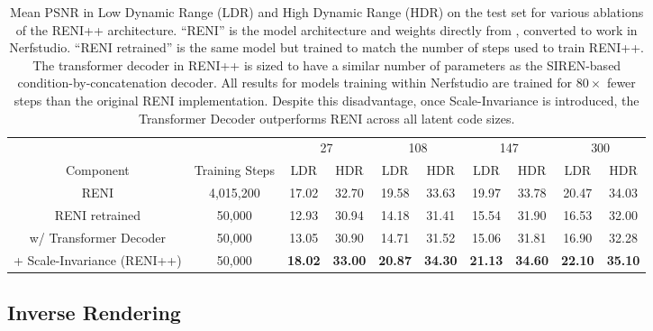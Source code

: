 \begin{table}\centering
{}
\begin{tabular}{@{}c c cc cc cc cc@{}}\toprule
& & \multicolumn{2}{c}{27} & \multicolumn{2}{c}{108} & \multicolumn{2}{c}{147} & \multicolumn{2}{c}{300}   \\
\cmidrule(lr){3-4} \cmidrule(lr){5-6} \cmidrule(lr){7-8} \cmidrule(lr){9-10}
Component & Training Steps & LDR & HDR & LDR & HDR & LDR & HDR & LDR & HDR \\
\midrule
RENI \cite{gardner2022rotation} & 4,015,200 & 17.02 & 32.70 & 19.58 & 33.63 & 19.97 & 33.78 & 20.47 & 34.03 \\
RENI retrained & 50,000 & 12.93 & 30.94 & 14.18 & 31.41 & 15.54 & 31.90 & 16.53 & 32.00 \\
w/ Transformer Decoder & 50,000 & 13.05 & 30.90 & 14.71 & 31.52 & 15.06 & 31.81 & 16.90 & 32.28 \\
+ Scale-Invariance (RENI++) & 50,000 & \textbf{18.02} & \textbf{33.00} & \textbf{20.87} & \textbf{34.30} & \textbf{21.13} & \textbf{34.60} & \textbf{22.10} & \textbf{35.10} \\
\bottomrule
\end{tabular}
\caption{Mean PSNR in Low Dynamic Range (LDR) and High Dynamic Range (HDR) on the test set for various ablations of the RENI++ architecture. ``RENI'' is the model architecture and weights directly from \cite{gardner2022rotation}, converted to work in Nerfstudio. ``RENI retrained'' is the same model but trained to match the number of steps used to train RENI++. The transformer decoder in RENI++ is sized to have a similar number of parameters as the SIREN-based condition-by-concatenation decoder. All results for models training within Nerfstudio are trained for $80\times$ fewer steps than the original RENI implementation. Despite this disadvantage, once Scale-Invariance is introduced, the Transformer Decoder outperforms RENI across all latent code sizes.}
\label{tab:ablation_study}
\end{table}

\subsection{Inverse Rendering}
\label{Inverse Rendering} 

